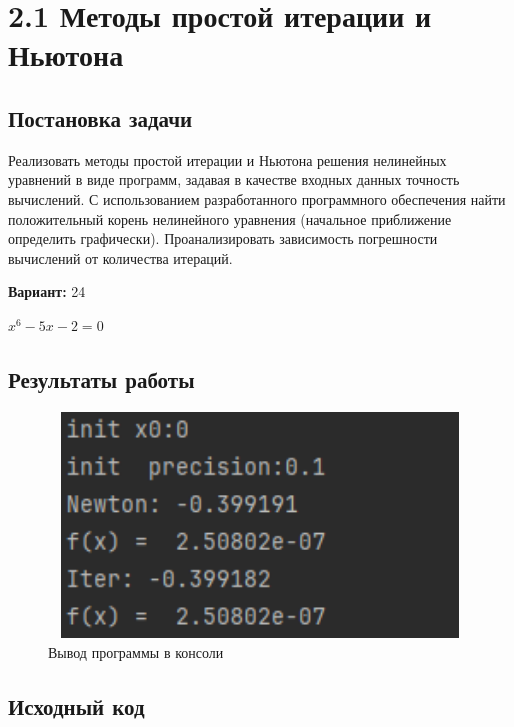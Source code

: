 \section* {2.1  Методы простой итерации и Ньютона}

\subsection{Постановка задачи}
Реализовать методы простой итерации и Ньютона решения нелинейных уравнений в виде программ, задавая в качестве входных данных точность вычислений. С использованием разработанного программного обеспечения найти положительный корень нелинейного уравнения (начальное приближение определить графически). Проанализировать зависимость погрешности вычислений от количества итераций.

{\bfseries Вариант:} 24

$x^6-5x-2=0$

\subsection{Результаты работы}
\begin{figure}[h!]
\centering
\includegraphics[width=12cm, height=6cm]{img/lab2_1_res.png}
\caption{Вывод программы в консоли}
\end{figure}
\pagebreak

\subsection{Исходный код}









\pagebreak

